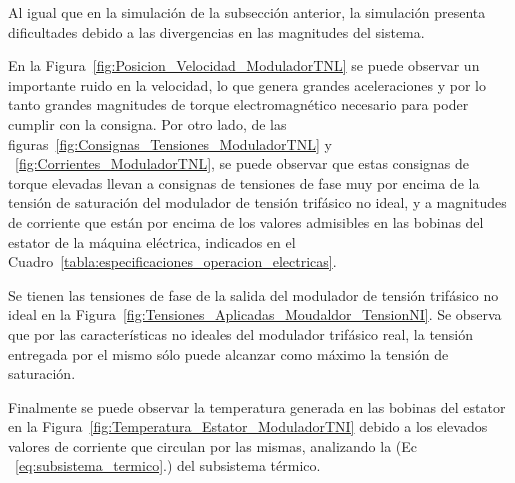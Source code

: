 \documentclass{article}
\begin{document}
Al igual que en la simulaci\'on de la subsecci\'on anterior, la simulaci\'on presenta dificultades debido a las divergencias en las magnitudes del sistema.

En la Figura~\ref{fig:Posicion_Velocidad_ModuladorTNL} se puede observar un importante ruido en la velocidad, lo que genera grandes aceleraciones y por lo tanto grandes magnitudes de torque electromagnético necesario para poder cumplir con la consigna. Por otro lado, de las figuras~\ref{fig:Consignas_Tensiones_ModuladorTNL} y ~\ref{fig:Corrientes_ModuladorTNL}, se puede observar que estas consignas de torque elevadas llevan a consignas de tensiones de fase muy por encima de la tensión de saturación del modulador de tensión trifásico no ideal, y a magnitudes de corriente que están por encima de los valores admisibles en las bobinas del estator de la máquina eléctrica, indicados en el Cuadro~\ref{tabla:especificaciones_operacion_electricas}. 

Se tienen las tensiones de fase de la salida del modulador de tensión trifásico no ideal en la Figura~\ref{fig:Tensiones_Aplicadas_Moudaldor_TensionNI}. Se observa que por las características no ideales del modulador trifásico real, la tensión entregada por el mismo sólo puede alcanzar como máximo la tensión de saturación.

Finalmente se puede observar la temperatura generada en las bobinas del estator en la Figura~\ref{fig:Temperatura_Estator_ModuladorTNI} debido a los elevados valores de corriente que circulan por las mismas, analizando la (Ec ~\ref{eq:subsistema_termico}.) del subsistema térmico.
\end{document}
